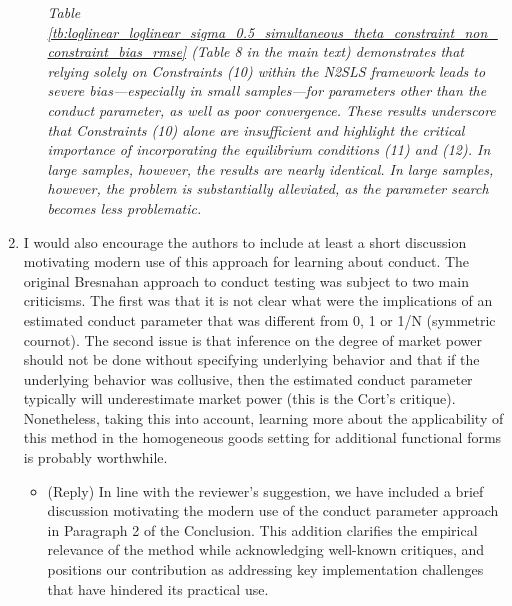 \documentclass[11pt, a4paper]{article}
\theoremstyle{remark}
\begin{document}
\begin{enumerate}
\begin{itemize}
        \textit{Table \ref{tb:loglinear_loglinear_sigma_0.5_simultaneous_theta_constraint_non_constraint_bias_rmse} (Table 8 in the main text) demonstrates that relying solely on Constraints (10) within the N2SLS framework leads to severe bias—especially in small samples—for parameters other than the conduct parameter, as well as poor convergence. These results underscore that Constraints (10) alone are insufficient and highlight the critical importance of incorporating the equilibrium conditions (11) and (12). In large samples, however, the results are nearly identical. In large samples, however, the problem is substantially alleviated, as the parameter search becomes less problematic.}
    \end{itemize}
    \item I would also encourage the authors to include at least a short discussion motivating modern use of this approach for learning about conduct. The original Bresnahan approach to conduct testing was subject to two main criticisms. The first was that it is not clear what were the implications of an estimated conduct parameter that was different from 0, 1 or 1/N (symmetric cournot). The second issue is that inference on the degree of market power should not be done without specifying underlying behavior and that if the underlying behavior was collusive, then the estimated conduct parameter typically will underestimate market power (this is the Cort’s critique). Nonetheless, taking this into account, learning more about the applicability of this method in the homogeneous goods setting for additional functional forms is probably worthwhile.
    \begin{itemize}
        \item (Reply) In line with the reviewer’s suggestion, we have included a brief discussion motivating the modern use of the conduct parameter approach in Paragraph 2 of the Conclusion. This addition clarifies the empirical relevance of the method while acknowledging well-known critiques, and positions our contribution as addressing key implementation challenges that have hindered its practical use.
        

\end{itemize}
\end{enumerate}
\end{document}
